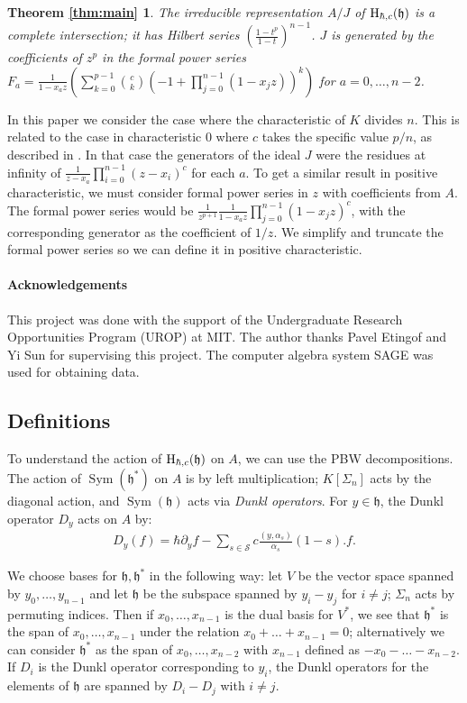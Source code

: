 \documentclass{article}
\numberwithin{equation}{section}
\newcommand{\h}{\mathfrak{h}}
\newcommand{\HH}{{\rm H}}
\newcommand{\Sym}{\operatorname{Sym}}
\begin{document}
 \newtheorem*{thm:main}{Theorem \ref{thm:main}}
\begin{thm:main} The irreducible representation $A/J$  of $\HH_{\hbar,c}(\h)$ is a complete intersection; it has Hilbert series $\left(\frac{1-t^p}{1-t}\right)^{n-1}$. $J$ is generated by the coefficients of $z^p$ in the formal power series \\
$F_a=\frac{1}{1-x_az} \left( \sum_{k=0}^{p-1} \binom{c}{k}(-1+\prod_{j=0}^{n-1} (1-x_jz))^k\right)$ for $a=0,\dots,n-2$. 
\end{thm:main}

In this paper we consider the case where the characteristic of $K$ divides $n$. This is related to the case in characteristic $0$ where $c$ takes the specific value $p/n$, as described in \cite{CE}. In that case the generators of the ideal $J$ were the residues at infinity of $\frac{1}{z-x_a} \prod_{i=0}^{n-1} (z-x_i)^c$ for each $a$. To get a similar result in positive characteristic, we must consider formal power series in $z$ with coefficients from $A$. The formal power series would be $\frac{1}{z^{p+1}}\frac{1}{1-x_az}\prod_{j=0}^{n-1} (1-x_jz)^c$, with the corresponding generator as the coefficient of $1/z$. We simplify and truncate the formal power series so we can define it in positive characteristic.

\paragraph{Acknowledgements} This project was done with the support of the Undergraduate Research Opportunities Program (UROP) at MIT. The author thanks Pavel Etingof and Yi Sun for supervising this project. The computer algebra system SAGE was used for obtaining data.

 \subsection{Definitions}

To understand the action of $\HH_{\hbar,c}(\h)$ on $A$, we can use the PBW decompositions. The action of $\Sym(\h^*)$ on $A$ is by left multiplication; $K[\Sigma_n]$ acts by the diagonal action, and $\Sym(\h)$ acts via {\it Dunkl operators}. For $y \in \h$, the Dunkl operator $D_y$ acts on $A$ by:
\begin{align*}
D_y(f) = \hbar \partial_y f  - \sum_{s \in \mathcal{S}} c \frac{ ( y, \alpha_s )}{\alpha_s} (1-s). f.
\end{align*}

We choose bases for $\h,\h^*$ in the following way: let $V$ be the vector space spanned by $y_0,\dots,y_{n-1}$ and let $\h$ be the subspace spanned by $y_i-y_j$ for $i \ne j$; $\Sigma_n$ acts by permuting indices. Then if $x_0,\dots,x_{n-1}$ is the dual basis for $V^*$, we see that $\h^*$ is the span of $x_0,\dots,x_{n-1}$ under the relation $x_0+\dots+x_{n-1}=0$; alternatively we can consider $\h^*$ as the span of $x_0,\dots,x_{n-2}$ with $x_{n-1}$ defined as $-x_0-\dots-x_{n-2}$.  If $D_i$ is the Dunkl operator corresponding to $y_i$, the Dunkl operators for the elements of $\h$ are spanned by $D_i-D_j$ with $i \ne j$. 
\end{document}
